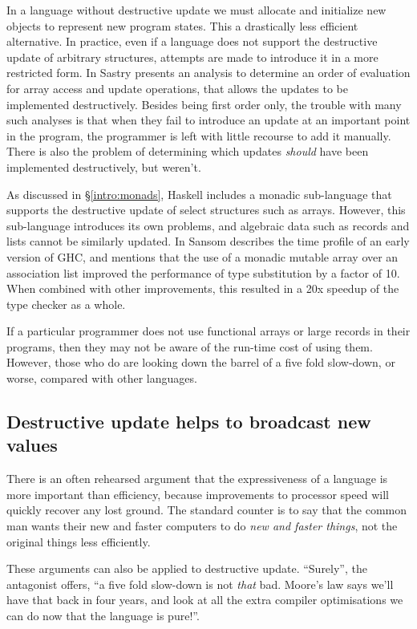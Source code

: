 In a language without destructive update we must allocate and initialize new objects to represent new program states. This a drastically less efficient alternative. In practice, even if a language does not support the destructive update of arbitrary structures, attempts are made to introduce it in a more restricted form. In \cite{sastry:order-of-evaluation-analysis} Sastry presents an analysis to determine an order of evaluation for array access and update operations, that allows the updates to be implemented destructively. Besides being first order only, the trouble with many such analyses is that when they fail to introduce an update at an important point in the program, the programmer is left with little recourse to add it manually. There is also the problem of determining which updates \emph{should} have been implemented destructively, but weren't. 

As discussed in \S\ref{intro:monads}, Haskell includes a monadic sub-language that supports the destructive update of select structures such as arrays. However, this sub-language introduces its own problems, and algebraic data such as records and lists cannot be similarly updated. In \cite{sansom:time-profiling} Sansom describes the time profile of an early version of GHC, and mentions that the use of a monadic mutable array over an association list improved the performance of type substitution by a factor of 10. When combined with other improvements, this resulted in a 20x speedup of the type checker as a whole.
 
If a particular programmer does not use functional arrays or large records in their programs, then they may not be aware of the run-time cost of using them. However, those who do are looking down the barrel of a five fold slow-down, or worse, compared with other languages.


\subsection{Destructive update helps to broadcast new values}
\label{Intro:Update:broadcast}
There is an often rehearsed argument that the expressiveness of a language is more important than efficiency, because improvements to processor speed will quickly recover any lost ground. The standard counter is to say that the common man wants their new and faster computers to do \emph{new and faster things}, not the original things less efficiently.

These arguments can also be applied to destructive update. ``Surely'', the antagonist offers, ``a five fold slow-down is not \emph{that} bad. Moore's law says we'll have that back in four years, and look at all the extra compiler optimisations we can do now that the language is pure!''.

